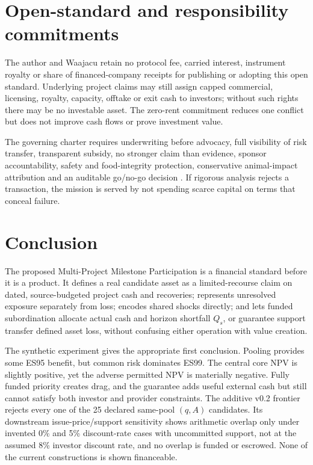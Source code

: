 \documentclass[11pt,a4paper]{article}
\begin{document}
\section{Open-standard and responsibility commitments}

The author and Waajacu retain no protocol fee, carried interest, instrument royalty or share of financed-company receipts for publishing or adopting this open standard. Underlying project claims may still assign capped commercial, licensing, royalty, capacity, offtake or exit cash to investors; without such rights there may be no investable asset. The zero-rent commitment reduces one conflict but does not improve cash flows or prove investment value.

The governing charter requires underwriting before advocacy, full visibility of risk transfer, transparent subsidy, no stronger claim than evidence, sponsor accountability, safety and food-integrity protection, conservative animal-impact attribution and an auditable go/no-go decision \citep{fca2026charter}. If rigorous analysis rejects a transaction, the mission is served by not spending scarce capital on terms that conceal failure.

\section{Conclusion}

The proposed Multi-Project Milestone Participation is a financial standard before it is a product. It defines a real candidate asset as a limited-recourse claim on dated, source-budgeted project cash and recoveries; represents unresolved exposure separately from loss; encodes shared shocks directly; and lets funded subordination allocate actual cash and horizon shortfall \(Q_s\), or guarantee support transfer defined asset loss, without confusing either operation with value creation.

The synthetic experiment gives the appropriate first conclusion. Pooling provides some ES95 benefit, but common risk dominates ES99. The central core NPV is slightly positive, yet the adverse permitted NPV is materially negative. Fully funded priority creates drag, and the guarantee adds useful external cash but still cannot satisfy both investor and provider constraints. The additive v0.2 frontier rejects every one of the 25 declared same-pool \((q,A)\) candidates. Its downstream issue-price/support sensitivity shows arithmetic overlap only under invented 0\% and 5\% discount-rate cases with uncommitted support, not at the assumed 8\% investor discount rate, and no overlap is funded or escrowed. None of the current constructions is shown financeable.
\end{document}
